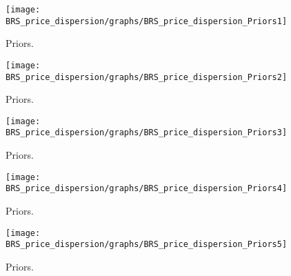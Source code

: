  
\begin{figure}[H]
\centering
\texttt{[image: BRS\_price\_dispersion/graphs/BRS\_price\_dispersion\_Priors1]}
\caption{Priors.}\label{Fig:Priors:1}
\end{figure}
\begin{figure}[H]
\centering
\texttt{[image: BRS\_price\_dispersion/graphs/BRS\_price\_dispersion\_Priors2]}
\caption{Priors.}\label{Fig:Priors:2}
\end{figure}
\begin{figure}[H]
\centering
\texttt{[image: BRS\_price\_dispersion/graphs/BRS\_price\_dispersion\_Priors3]}
\caption{Priors.}\label{Fig:Priors:3}
\end{figure}
\begin{figure}[H]
\centering
\texttt{[image: BRS\_price\_dispersion/graphs/BRS\_price\_dispersion\_Priors4]}
\caption{Priors.}\label{Fig:Priors:4}
\end{figure}
\begin{figure}[H]
\centering
\texttt{[image: BRS\_price\_dispersion/graphs/BRS\_price\_dispersion\_Priors5]}
\caption{Priors.}\label{Fig:Priors:5}
\end{figure}
 

